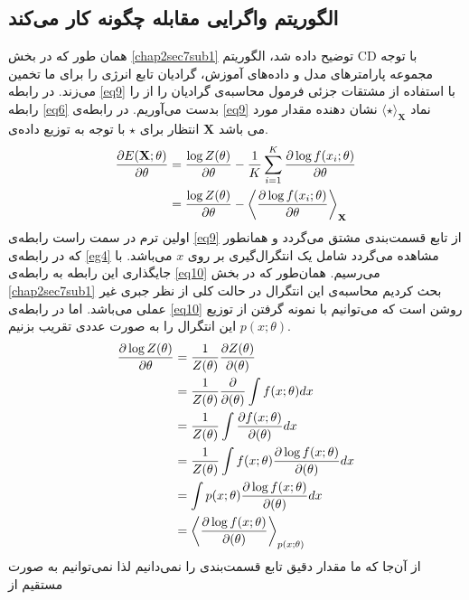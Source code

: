 \subsection{الگوریتم واگرایی مقابله چگونه کار می‌کند}
همان طور که در بخش
\ref{chap2sec7sub1}
توضیح داده شد، الگوریتم
CD
با توجه مجموعه پارامترهای مدل و داده‌های آموزش، گرادیان تابع انرژی را برای ما تخمین می‌‌زند.  در رابطه
\ref{eq9}
 با استفاده از مشتقات جزئی فرمول محاسبه‌ی گرادیان را از را رابطه
\ref{eq6}
 بدست می‌‌آوریم. در رابطه‌ی
\ref{eq9}
 نماد
$\langle \star \rangle_\textbf{X}$
 نشان دهنده مقدار مورد انتظار برای
$\star$
 با توجه به توزیع داده‌ی
\textbf{X}
 می‌ باشد.
\begin{align}
\centering
\label{eq9}
	\dfrac{\partial E(\textbf{X};\theta)}{\partial \theta} &= \dfrac{\log Z(\theta)}{\partial \theta} - \dfrac{1}{K}\sum_{i=1}^K\dfrac{\partial \log f(x_i;\theta)}{\partial \theta}\\\nonumber
	&= \dfrac{\log Z(\theta)}{\partial \theta} - \left\langle \dfrac{\partial \log f(x_i;\theta)}{\partial \theta}\right\rangle_\textbf{X}
\end{align}
اولین ترم در سمت راست رابطه‌‌ی
\ref{eq9}
از تابع قسمت‌بندی مشتق می‌گردد و همانطور که در رابطه‌ی
\ref{eg4}
مشاهده می‌‌گردد شامل یک انتگرال‌گیری بر روی
$x$
می‌باشد. با جایگذاری این رابطه به رابطه‌ی
\ref{eq10}
می‌رسیم. همان‌طور که در بخش
\ref{chap2sec7sub1}
بحث کردیم محاسبه‌ی این انتگرال در حالت کلی‌ از نظر جبری غیر عملی‌ می‌‌باشد. اما در رابطه‌ی
\ref{eq10}
روشن است که می‌‌توانیم با نمونه گرفتن از توزیع
$p(x;\theta)$
این انتگرال را به صورت عددی تقریب بزنیم.
\begin{align}
\centering
\label{eq10}
	\dfrac{\partial\log Z(\theta)}{\partial \theta} &= \dfrac{1}{Z(\theta)}\dfrac{\partial Z(\theta)}{\partial(\theta)}\\ \nonumber
	&=\dfrac{1}{Z(\theta)}\dfrac{\partial}{\partial(\theta)}\int f(x;\theta)dx\\ \nonumber
	&=\dfrac{1}{Z(\theta)}\int \dfrac{\partial f(x;\theta)}{\partial(\theta)}dx\\	\nonumber
	&=\dfrac{1}{Z(\theta)}\int f(x;\theta) \dfrac{\partial \log f(x;\theta)}{\partial(\theta)}dx\\ \nonumber
	&= \int p(x;\theta) \dfrac{\partial \log f(x;\theta)}{\partial(\theta)}dx\\ \nonumber
	&= \left\langle \dfrac{\partial \log f(x;\theta)}{\partial(\theta)}\right\rangle_{p(x;\theta)}
\end{align}
از آن‌جا که ما مقدار دقیق تابع قسمت‌بندی را نمی‌‌دانیم لذا نمی‌‌توانیم به صورت مستقیم از
